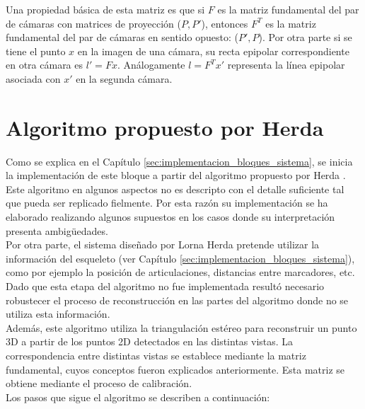 Una propiedad básica de esta matriz es que si $F$ es la matriz fundamental del par de cámaras con matrices de proyección ($P,P'$), entonces $F^T$ es la matriz fundamental del par de cámaras en sentido opuesto: ($P',P$). Por otra parte si se tiene el punto $x$ en la imagen de una cámara, su recta epipolar correspondiente en otra cámara es $l'=Fx$. Análogamente $l=F^Tx'$ representa la línea epipolar asociada con $x'$ en la segunda cámara.

\section{Algoritmo propuesto por Herda }

Como se explica en el Capítulo \ref{sec:implementacion_bloques_sistema}, se inicia la implementación de este bloque a partir del algoritmo propuesto por Herda \cite{herda}. Este algoritmo en algunos aspectos no es descripto con el detalle suficiente tal que pueda ser replicado fielmente. Por esta razón su implementación se ha elaborado realizando algunos supuestos en los casos donde su interpretación presenta ambigüedades.\\

Por otra parte, el sistema diseñado por Lorna Herda pretende utilizar la información del esqueleto (ver Capítulo \ref{sec:implementacion_bloques_sistema}), como por ejemplo la posición de articulaciones, distancias entre marcadores, etc. Dado que esta etapa del algoritmo no fue implementada resultó necesario robustecer el proceso de reconstrucción en las partes del algoritmo donde no se utiliza esta información.\\


Además, este algoritmo utiliza la triangulación estéreo para reconstruir un punto 3D a partir de los puntos 2D detectados en las distintas vistas. La correspondencia entre distintas vistas se establece mediante la matriz fundamental, cuyos conceptos fueron explicados anteriormente. Esta matriz se obtiene mediante el proceso de calibración.\\

Los pasos que sigue el algoritmo se describen a continuación:\

